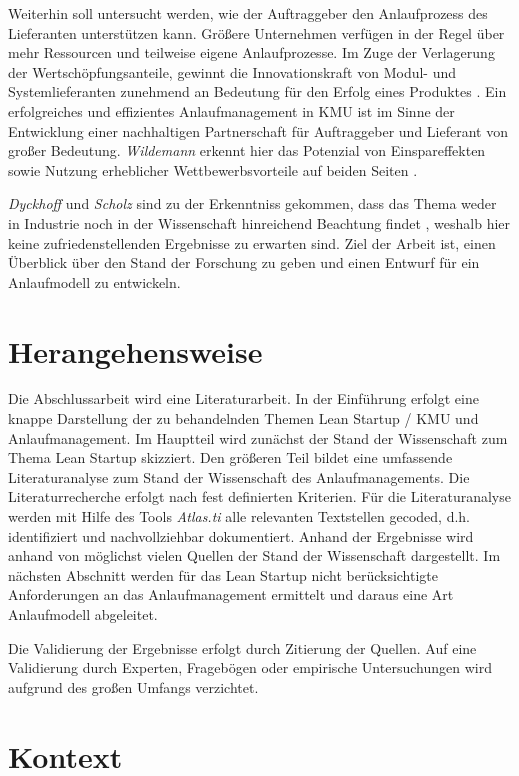 Weiterhin soll untersucht werden, wie der Auftraggeber den Anlaufprozess des Lieferanten unterstützen kann. Größere Unternehmen verfügen in der Regel über mehr Ressourcen und teilweise eigene Anlaufprozesse. Im Zuge der Verlagerung der Wertschöpfungsanteile, gewinnt die Innovationskraft von Modul- und Systemlieferanten zunehmend an Bedeutung für den Erfolg eines Produktes \cite{Kuhn2002}. Ein erfolgreiches und effizientes Anlaufmanagement in KMU ist im Sinne der Entwicklung einer nachhaltigen Partnerschaft für Auftraggeber und Lieferant von großer Bedeutung. \textit{Wildemann} erkennt hier das Potenzial von Einspareffekten sowie Nutzung erheblicher Wettbewerbsvorteile auf beiden Seiten \cite{Wildemann2008}.

\textit{Dyckhoff} und \textit{Scholz} sind zu der Erkenntniss gekommen, dass das Thema weder in Industrie noch in der Wissenschaft hinreichend Beachtung findet \cite{Dyckhoff2012, Scholz2010}, weshalb hier keine zufriedenstellenden Ergebnisse zu erwarten sind.
Ziel der Arbeit ist, einen Überblick über den Stand der Forschung zu geben und einen Entwurf für ein Anlaufmodell zu entwickeln. 

\section{Herangehensweise}
Die Abschlussarbeit wird eine Literaturarbeit. In der Einführung erfolgt eine knappe Darstellung der zu behandelnden Themen Lean Startup / KMU und Anlaufmanagement. Im Hauptteil wird zunächst der Stand der Wissenschaft zum Thema Lean Startup skizziert. Den größeren Teil bildet eine umfassende Literaturanalyse zum Stand der Wissenschaft des Anlaufmanagements. Die Literaturrecherche erfolgt nach fest definierten Kriterien. Für die Literaturanalyse werden mit Hilfe des Tools \textit{Atlas.ti} alle relevanten Textstellen gecoded, d.h. identifiziert und nachvollziehbar dokumentiert. Anhand der  Ergebnisse wird anhand von möglichst vielen Quellen der Stand der Wissenschaft dargestellt. Im nächsten Abschnitt werden für das Lean Startup nicht berücksichtigte Anforderungen an das Anlaufmanagement ermittelt und daraus eine Art Anlaufmodell abgeleitet. 

Die Validierung der Ergebnisse erfolgt durch Zitierung der Quellen. Auf eine Validierung durch Experten, Fragebögen oder empirische Untersuchungen wird aufgrund des großen Umfangs verzichtet.
%
\section{Kontext}

